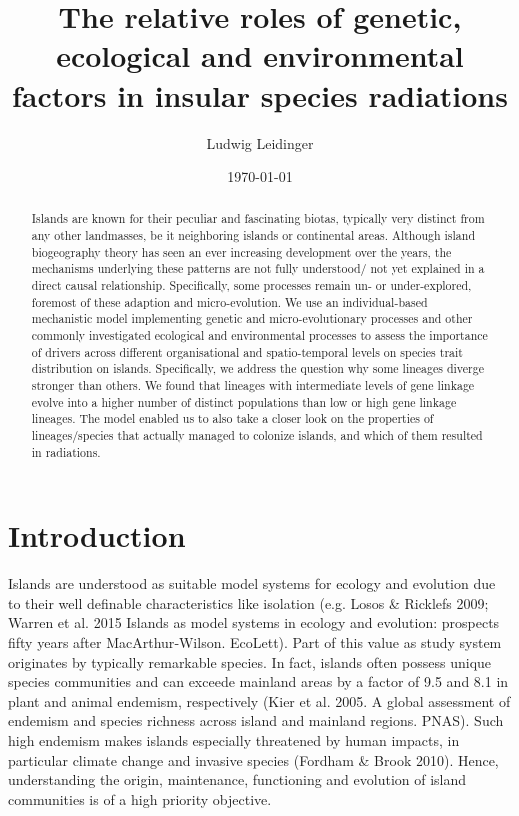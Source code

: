 \documentclass[a4paper]{scrartcl}
\title{The relative roles of genetic, ecological and environmental factors in insular species radiations}
\author{Ludwig Leidinger}
\date{\today}
\begin{document}
\maketitle

\begin{abstract}
  Islands are known for their peculiar and fascinating biotas, typically very distinct from any other landmasses, be it neighboring islands or continental areas.
  Although island biogeography theory has seen an ever increasing development over the years,
  the mechanisms underlying these patterns are not fully understood/ not yet explained in a direct causal relationship.
  Specifically, some processes remain un- or under-explored, foremost of these adaption and micro-evolution.
  We use an individual-based mechanistic model implementing genetic and micro-evolutionary processes and other commonly investigated ecological and
  environmental processes to assess the importance of drivers across different organisational and spatio-temporal levels
  on species trait distribution on islands.
  Specifically, we address the question why some lineages diverge stronger than others.
  We found that lineages with intermediate levels of gene linkage evolve into a higher number of distinct populations
  than low or high gene linkage lineages.
  The model enabled us to also take a closer look on the properties of lineages/species that actually managed to colonize islands,
  and which of them resulted in radiations.
\end{abstract}

\section{Introduction}
Islands are understood as suitable model systems for ecology and evolution due to their well definable characteristics like isolation (e.g. Losos \& Ricklefs 2009; Warren et al. 2015  Islands as model systems in ecology and evolution: prospects fifty years after MacArthur‐Wilson. EcoLett). %
Part of this value as study system originates by typically remarkable species. In fact, islands often possess unique species communities and can exceede mainland areas by a factor of 9.5 and 8.1 in plant and animal  endemism, respectively (Kier et al. 2005. A global assessment of endemism and species richness across island and mainland regions. PNAS). %
Such high endemism makes islands  especially threatened by human impacts, in particular climate change and invasive species (Fordham \& Brook 2010). %
Hence, understanding the origin, maintenance, functioning and evolution of island communities is of a high priority objective.
\end{document}
